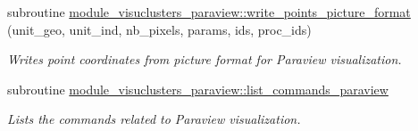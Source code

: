 \begin{DoxyCompactItemize}
subroutine \hyperlink{namespacemodule__visuclusters__paraview_a532fbeef76809cf8c4ab2ea3cee9eaee}{module\+\_\+visuclusters\+\_\+paraview\+::write\+\_\+points\+\_\+picture\+\_\+format} (unit\+\_\+geo, unit\+\_\+ind, nb\+\_\+pixels, params, ids, proc\+\_\+ids)
\begin{DoxyCompactList}\small\item\em Writes point coordinates from picture format for Paraview visualization. \end{DoxyCompactList}\item 
subroutine \hyperlink{namespacemodule__visuclusters__paraview_a264164136b0ed4e82c5ef10cfaa2d649}{module\+\_\+visuclusters\+\_\+paraview\+::list\+\_\+commands\+\_\+paraview}
\begin{DoxyCompactList}\small\item\em Lists the commands related to Paraview visualization. \end{DoxyCompactList}\end{DoxyCompactItemize}
